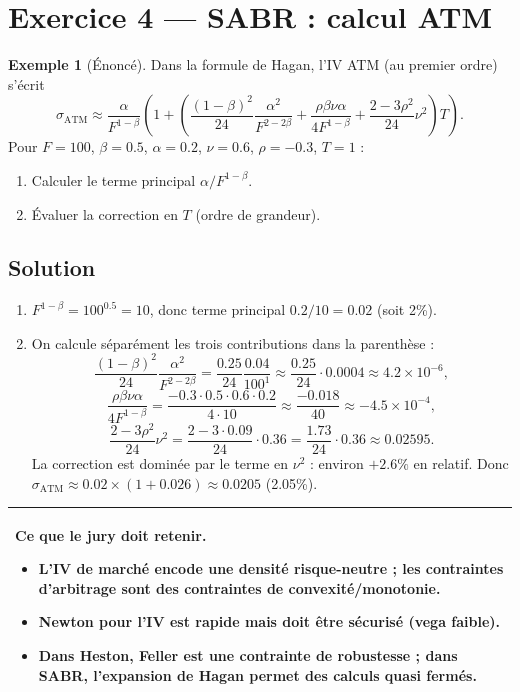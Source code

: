 \documentclass[11pt,a4paper]{report}
\newcommand{\1}{\mathbbm{1}}
\theoremstyle{definition}
\newtheorem{example}{Exemple}[chapter]
\theoremstyle{plain}
\theoremstyle{remark}
\newenvironment{jurybox}{%
  \begin{center}
  \setlength{\tabcolsep}{6pt}%
  \renewcommand{\arraystretch}{1.1}%
  \begin{tabular}{|p{0.94\textwidth}|}
  \hline
  \small\textbf{Ce que le jury doit retenir.}\par\medskip
}{%
  \\ \hline
  \end{tabular}
  \end{center}
}
\begin{document}
\section{Exercice 4 --- SABR : calcul ATM}
\begin{example}[Énoncé]
Dans la formule de Hagan, l'IV ATM (au premier ordre) s'écrit
\[\sigma_{\mathrm{ATM}}\approx \frac{\alpha}{F^{1-\beta}}\left(1 + \left(\frac{(1-\beta)^2}{24}\frac{\alpha^2}{F^{2-2\beta}}+\frac{\rho\beta\nu\alpha}{4F^{1-\beta}}+\frac{2-3\rho^2}{24}\nu^2\right)T\right).
\]
Pour $F=100$, $\beta=0.5$, $\alpha=0.2$, $\nu=0.6$, $\rho=-0.3$, $T=1$ :
\begin{enumerate}[label=\alph*)]
  \item Calculer le terme principal $\alpha/F^{1-\beta}$.
  \item Évaluer la correction en $T$ (ordre de grandeur).
\end{enumerate}
\end{example}

\subsection*{Solution}
\begin{enumerate}[label=\alph*)]
  \item $F^{1-\beta}=100^{0.5}=10$, donc terme principal $0.2/10=0.02$ (soit 2\%).
  \item On calcule séparément les trois contributions dans la parenthèse :
  \[
  \frac{(1-\beta)^2}{24}\frac{\alpha^2}{F^{2-2\beta}}=\frac{0.25}{24}\frac{0.04}{100^{1}}\approx \frac{0.25}{24}\cdot 0.0004 \approx 4.2\times 10^{-6},
  \]
  \[
  \frac{\rho\beta\nu\alpha}{4F^{1-\beta}}=\frac{-0.3\cdot 0.5\cdot 0.6\cdot 0.2}{4\cdot 10}\approx \frac{-0.018}{40}\approx -4.5\times 10^{-4},
  \]
  \[
  \frac{2-3\rho^2}{24}\nu^2=\frac{2-3\cdot 0.09}{24}\cdot 0.36=\frac{1.73}{24}\cdot 0.36\approx 0.02595.
  \]
  La correction est dominée par le terme en $\nu^2$ : environ $+2.6\%$ en relatif.
  Donc $\sigma_{\mathrm{ATM}}\approx 0.02\times(1+0.026)\approx 0.0205$ (2.05\%).
\end{enumerate}

\begin{jurybox}
\begin{itemize}
  \item L'IV de marché encode une densité risque-neutre ; les contraintes d'arbitrage sont des contraintes de convexité/monotonie.
  \item Newton pour l'IV est rapide mais doit être sécurisé (vega faible).
  \item Dans Heston, Feller est une contrainte de robustesse ; dans SABR, l'expansion de Hagan permet des calculs quasi fermés.
\end{itemize}
\end{jurybox}
\end{document}
